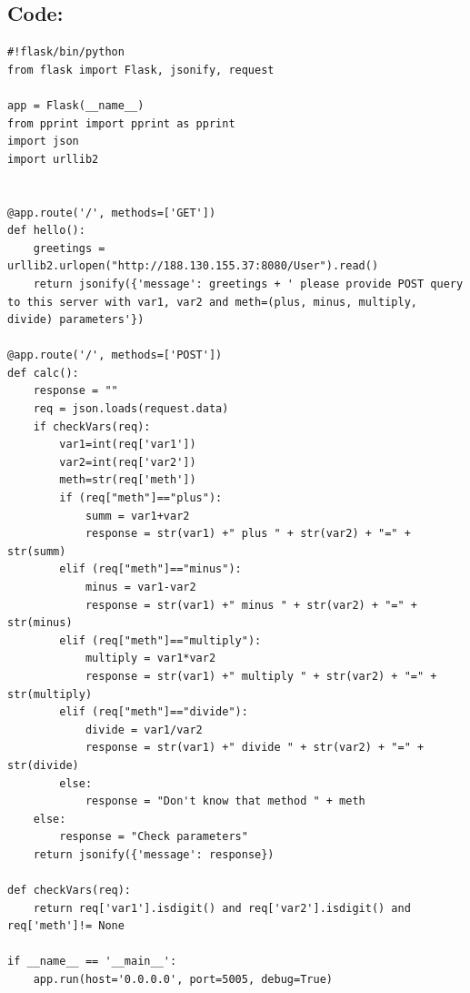 \documentclass[10pt]{article}
\begin{document}
\subsection{Code:}
\begin{verbatim}
#!flask/bin/python
from flask import Flask, jsonify, request

app = Flask(__name__)
from pprint import pprint as pprint
import json
import urllib2


@app.route('/', methods=['GET'])
def hello():
    greetings = urllib2.urlopen("http://188.130.155.37:8080/User").read()
    return jsonify({'message': greetings + ' please provide POST query to this server with var1, var2 and meth=(plus, minus, multiply, divide) parameters'})

@app.route('/', methods=['POST'])
def calc():
    response = ""
    req = json.loads(request.data)
    if checkVars(req):
        var1=int(req['var1'])
        var2=int(req['var2'])
        meth=str(req['meth'])
        if (req["meth"]=="plus"):
            summ = var1+var2
            response = str(var1) +" plus " + str(var2) + "=" + str(summ)
        elif (req["meth"]=="minus"):
            minus = var1-var2
            response = str(var1) +" minus " + str(var2) + "=" + str(minus)
        elif (req["meth"]=="multiply"):
            multiply = var1*var2
            response = str(var1) +" multiply " + str(var2) + "=" + str(multiply)
        elif (req["meth"]=="divide"):
            divide = var1/var2
            response = str(var1) +" divide " + str(var2) + "=" + str(divide)
        else:
            response = "Don't know that method " + meth
    else:
        response = "Check parameters"
    return jsonify({'message': response})

def checkVars(req):
    return req['var1'].isdigit() and req['var2'].isdigit() and req['meth']!= None

if __name__ == '__main__':
    app.run(host='0.0.0.0', port=5005, debug=True)
\end{verbatim}
\end{document}
